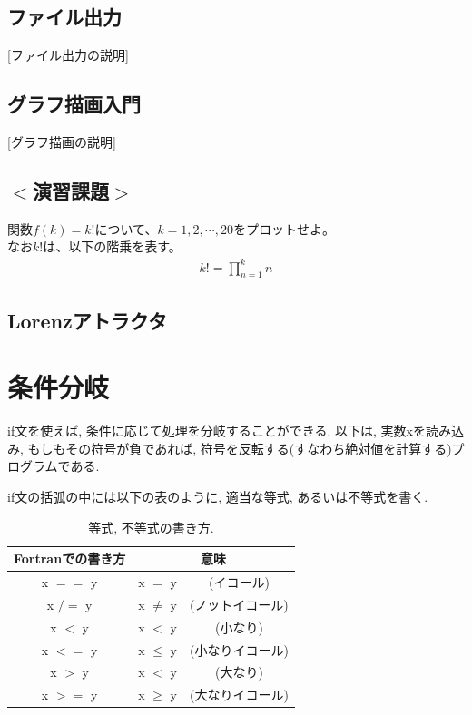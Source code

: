 \documentclass[a4j]{jsbook}
\begin{document}
\subsection*{ファイル出力}
[ファイル出力の説明]

\subsection*{グラフ描画入門}
[グラフ描画の説明]

\subsection*{$<$演習課題$>$}
関数$f(k) = k!$について、$k=1,2, \cdots, 20$をプロットせよ。\\
なお$k!$は、以下の階乗を表す。
\begin{eqnarray}
k! = \prod_{n=1}^{k} n
\end{eqnarray}



\subsection{Lorenzアトラクタ}



\section{条件分岐}
if文を使えば, 条件に応じて処理を分岐することができる. 
以下は, 実数xを読み込み, もしもその符号が負であれば, 
符号を反転する(すなわち絶対値を計算する)プログラムである. 

if文の括弧の中には以下の表のように, 適当な等式, あるいは不等式を書く. 

\begin{table}[h]
  \caption{等式, 不等式の書き方. }
  \begin{center}
    \begin{tabular}{ccc}
      \hline
      Fortranでの書き方   & \multicolumn{2}{c}{意味} \\ \hline
      x $==$ y   & x $=$ y &(イコール)\\
      x $/=$ y   & x $\ne$ y &(ノットイコール)\\
      x $<$ y   & x $<$ y &(小なり)\\
      x $<=$ y  & x $\le$ y &(小なりイコール)\\
      x $>$ y  & x $<$ y &(大なり)\\
      x $>=$ y   & x $\ge$ y &(大なりイコール)\\ \hline
    \end{tabular}
  \end{center}
\end{table}
\end{document}
